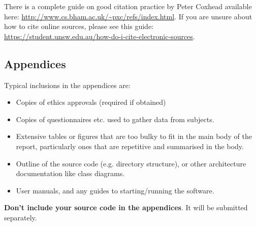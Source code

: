 \documentclass{l4proj}
\begin{document}
There is a complete guide on good citation practice by Peter Coxhead available here: \url{http://www.cs.bham.ac.uk/~pxc/refs/index.html}. 
If you are unsure about how to cite online sources, please see this guide: \url{https://student.unsw.edu.au/how-do-i-cite-electronic-sources}.

%
% 

\begin{appendices}

\chapter{Appendices}

Typical inclusions in the appendices are:

\begin{itemize}
\item
  Copies of ethics approvals (required if obtained)
\item
  Copies of questionnaires etc. used to gather data from subjects.
\item
  Extensive tables or figures that are too bulky to fit in the main body of
  the report, particularly ones that are repetitive and summarised in the body.

\item Outline of the source code (e.g. directory structure), or other architecture documentation like class diagrams.

\item User manuals, and any guides to starting/running the software.

\end{itemize}

\textbf{Don't include your source code in the appendices}. It will be
submitted separately.

\end{appendices}




\end{document}
